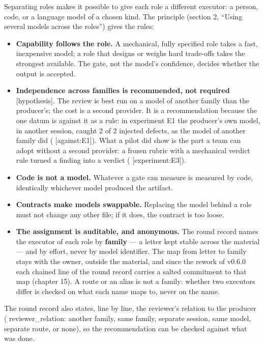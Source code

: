 \documentclass[
  american,
  10pt,
]{report}
\newcounter{none} %
\providecommand{\tightlist}{%
  \setlength{\itemsep}{0pt}\setlength{\parskip}{0pt}}
\renewcommand{\texttt}[1]{{\ttfamily\hyphenchar\font=-1 #1}}
\begin{document}
Separating roles makes it possible to give each role a different
executor: a person, code, or a language model of a chosen kind. The
principle (section 2, ``Using several models across the roles'') gives
the rules:

\begin{itemize}
\tightlist
\item
  \textbf{Capability follows the role.} A mechanical, fully specified
  role takes a fast, inexpensive model; a role that designs or weighs
  hard trade-offs takes the strongest available. The gate, not the
  model's confidence, decides whether the output is accepted.
\item
  \textbf{Independence across families is recommended, not required}
  \texttt{[hypothesis]}. The review is best run on a model of another
  family than the producer's; the cost is a second provider. It is a
  recommendation because the one datum is against it as a rule: in
  experiment E1 the producer's own model, in another session, caught 2
  of 2 injected defects, as the model of another family did
  (\texttt{[against:\allowbreak{}E1]}). What a pilot did show is the
  part a team can adopt without a second provider: a frozen rubric with
  a mechanical verdict rule turned a finding into a verdict
  (\texttt{[experiment:\allowbreak{}E3]}).
\item
  \textbf{Code is not a model.} Whatever a gate can measure is measured
  by code, identically whichever model produced the artifact.
\item
  \textbf{Contracts make models swappable.} Replacing the model behind a
  role must not change any other file; if it does, the contract is too
  loose.
\item
  \textbf{The assignment is auditable, and anonymous.} The round record
  names the executor of each role by \textbf{family} --- a letter kept
  stable across the material --- and by effort, never by model
  identifier. The map from letter to family stays with the owner,
  outside the material, and since the rework of v0.6.0 each chained line
  of the round record carries a salted commitment to that map (chapter
  15). A route or an alias is not a family: whether two executors differ
  is checked on what each name maps to, never on the name.
\end{itemize}

The round record also states, line by line, the reviewer's relation to
the producer (\texttt{reviewer\_\allowbreak{}relation}:
\texttt{another family}, \texttt{same family, separate session},
\texttt{same model, separate route}, or \texttt{none}), so the
recommendation can be checked against what was done.
\end{document}
